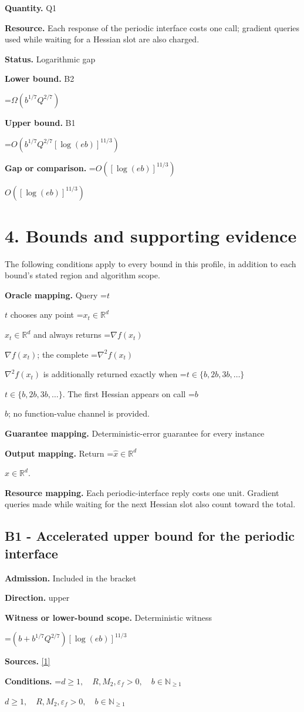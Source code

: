 \documentclass[10pt,a4paper]{article}
\newcommand{\AtlasMath}[1]{\par\begingroup\centering\setbox0=\hbox{$\displaystyle #1$}\ifdim\wd0>1.4\linewidth\typeout{ATLAS WIDE FORMULA: \the\wd0}\fi\ifdim\wd0>\linewidth\resizebox{\linewidth}{!}{\box0}\else\box0\fi\par\endgroup}
\newcommand{\AtlasInlineMath}[1]{\begingroup\setbox0=\hbox{$#1$}\ifdim\wd0>.4\linewidth\endgroup\AtlasMath{#1}\else\endgroup$#1$\fi}
\begin{document}
\textbf{Quantity.} Q1

\textbf{Resource.} Each response of the periodic interface costs one call; gradient queries used while waiting for a Hessian slot are also charged.

\textbf{Status.} Logarithmic gap

\textbf{Lower bound.} B2

\AtlasMath{\Omega(b^{1/7}Q^{2/7})}
\textbf{Upper bound.} B1

\AtlasMath{O(b^{1/7}Q^{2/7}[\log(eb)]^{11/3})}
\textbf{Gap or comparison.} \AtlasInlineMath{O([\log(eb)]^{11/3})}

\section{4. Bounds and supporting evidence}
The following conditions apply to every bound in this profile, in addition to each bound's stated region and algorithm scope.

\textbf{Oracle mapping.} Query \AtlasInlineMath{t} chooses any point \AtlasInlineMath{x_t\in\mathbb{R}^d} and always returns \AtlasInlineMath{\nabla f(x_t)}; the complete \AtlasInlineMath{\nabla^2f(x_t)} is additionally returned exactly when \AtlasInlineMath{t\in\{b,2b,3b,\ldots\}}. The first Hessian appears on call \AtlasInlineMath{b}; no function-value channel is provided.

\textbf{Guarantee mapping.} Deterministic-error guarantee for every instance

\textbf{Output mapping.} Return \AtlasInlineMath{\widehat{x}\in \mathbb{R}^d}.

\textbf{Resource mapping.} Each periodic-interface reply costs one unit. Gradient queries made while waiting for the next Hessian slot also count toward the total.

\subsection{B1 - Accelerated upper bound for the periodic interface}
\textbf{Admission.} Included in the bracket

\textbf{Direction.} upper

\textbf{Witness or lower-bound scope.} Deterministic witness

\AtlasMath{(b+b^{1/7}Q^{2/7})[\log(eb)]^{11/3}}
\textbf{Sources.} \href{https://arxiv.org/abs/2610.03222v1}{[1]}

\textbf{Conditions.} \AtlasInlineMath{d\ge1,\quad R,M_2,\varepsilon_f>0,\quad b\in\mathbb{N}_{\ge1}}
\end{document}
